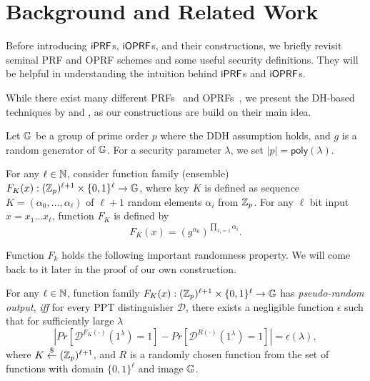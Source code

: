 \section{Background and Related Work}
Before introducing $\mathsf{i}\mathsf{PRF}$s, $\mathsf{i}\mathsf{OPRF}$s, and their constructions, we
briefly revisit seminal PRF and OPRF schemes and some useful
security definitions.  They will be helpful in understanding the
intuition behind $\mathsf{i}\mathsf{PRF}$s and $\mathsf{i}\mathsf{OPRF}$s.


While there exist many different
PRFs~\cite{chaum,prf,dodis,ggm,lewko,bonehprf} and
OPRFs~\cite{oprf,stan,chase,koles,boneh,kia}, we present the DH-based
techniques by \citet{prf} and \citet{oprf}, as our constructions are
build on their main idea.

Let $\mathbb{G}$ be a group of prime order $p$ where the DDH assumption
holds, and $g$ is a random generator of $\mathbb{G}$. For a security
parameter $\lambda$, we set $|p|=\mathsf{poly}(\lambda)$.

\begin{construction} \label{nrprf}
For any $\ell\in{\mathbb{N}}$, consider function family (ensemble)
$F_K(x):(\mathbb{Z}_p)^{\ell+1}\times\{0,1\}^\ell\rightarrow\mathbb{G}$,
where key $K$ is defined as sequence $K=(\alpha_0,\ldots,\alpha_\ell)$
of $\ell+1$ random elements $\alpha_i$ from $\mathbb{Z}_p$.  For any $\ell$ bit input
$x=x_1 \ldots x_\ell$, function $F_K$ is defined by
$$F_K(x) = (g^{\alpha_0})^{\prod_{x_i=1}\alpha_i}.$$
  \end{construction}

Function $F_k$ holds the following important randomness property. We
will come back to it later in the proof of our own construction.

\begin{definition}\label{def:pr}
For any $\ell\in{\mathbb{N}}$, function family $F_K(x):(\mathbb{Z}_p)^{\ell+1}\times\{0,1\}^{\ell}\rightarrow\mathbb{G}$ has \emph{pseudo-random output}, \emph{iff}
  for every PPT distinguisher
$\mathcal{D}$, there exists a negligible function $\epsilon$ such that
for sufficiently large $\lambda$
$$| Pr[\mathcal{D}^{F_K(\cdot)}(1^\lambda)=1] - Pr[\mathcal{D}^{R(\cdot)}(1^\lambda) = 1]|
    =\epsilon(\lambda), $$ where $K\stackrel{\$}{\leftarrow}(\mathbb{Z}_p)^{\ell+1}$, and $R$ is a randomly chosen function
    from the set of functions with domain $\{0,1\}^{\ell}$ and image
    $\mathbb{G}$.
\end{definition}



